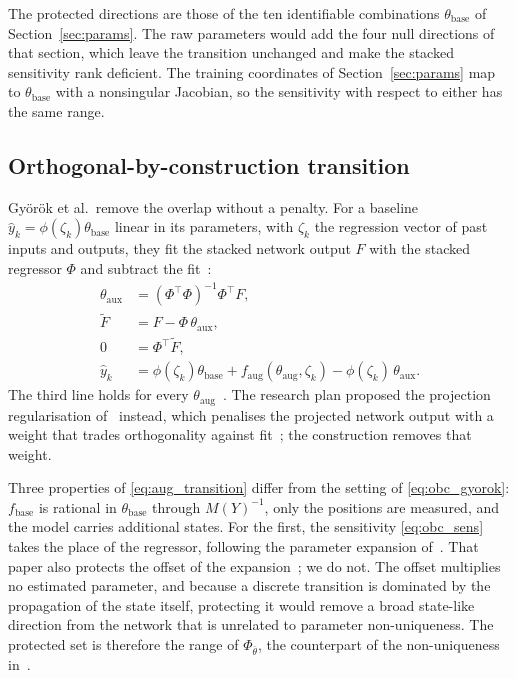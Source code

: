 The protected directions are those of the ten identifiable combinations
$\theta_{\mathrm{base}}$ of Section~\ref{sec:params}.
The raw parameters would add the four null directions of that section, which
leave the transition unchanged and make the stacked sensitivity rank deficient.
The training coordinates of Section~\ref{sec:params} map to
$\theta_{\mathrm{base}}$ with a nonsingular Jacobian, so the sensitivity with
respect to either has the same range.

\subsection{Orthogonal-by-construction transition}\label{sec:obc_map}
Gy\"or\"ok et al.\ remove the overlap without a penalty.
For a baseline $\hat y_k=\phi(\zeta_k)\theta_{\mathrm{base}}$ linear in its
parameters, with $\zeta_k$ the regression vector of past inputs and outputs, they
fit the stacked network output $F$ with the stacked regressor $\Phi$ and
subtract the fit~\cite[Eqs.~(8), (10), (11), (13)]{gyorok2026obc}:
\begin{equation}
\begin{aligned}
 \theta_{\mathrm{aux}}&=(\Phi^\top\Phi)^{-1}\Phi^\top F,\\
 \widetilde F&=F-\Phi\,\theta_{\mathrm{aux}},\\
 0&=\Phi^\top\widetilde F,\\
 \hat y_k&=\phi(\zeta_k)\theta_{\mathrm{base}}+f_{\mathrm{aug}}(\theta_{\mathrm{aug}},\zeta_k)
   -\phi(\zeta_k)\,\theta_{\mathrm{aux}}.
\end{aligned}
\label{eq:obc_gyorok}
\end{equation}
The third line holds for every $\theta_{\mathrm{aug}}$~\cite[Lemma~3]{gyorok2026obc}.
The research plan proposed the projection regularisation
of~\cite{gyorok2025l4dc} instead, which penalises the projected network output
with a weight that trades orthogonality against fit~\cite[Eq.~(13)]{gyorok2025l4dc};
the construction removes that weight.

Three properties of \eqref{eq:aug_transition} differ from the setting of
\eqref{eq:obc_gyorok}: $f_{\mathrm{base}}$ is rational in
$\theta_{\mathrm{base}}$ through $M(Y)^{-1}$, only the positions are measured,
and the model carries additional states.
For the first, the sensitivity \eqref{eq:obc_sens} takes the place of the
regressor, following the parameter expansion
of~\cite[Eq.~(15)]{gyorok2025l4dc}.
That paper also protects the offset of the
expansion~\cite[Eq.~(18)]{gyorok2025l4dc}; we do not.
The offset multiplies no estimated parameter, and because a discrete transition
is dominated by the propagation of the state itself, protecting it would remove
a broad state-like direction from the network that is unrelated to parameter
non-uniqueness.
The protected set is therefore the range of $\Phi_{\bar\theta}$, the
counterpart of the non-uniqueness in~\cite[Ex.~2]{gyorok2026obc}.

